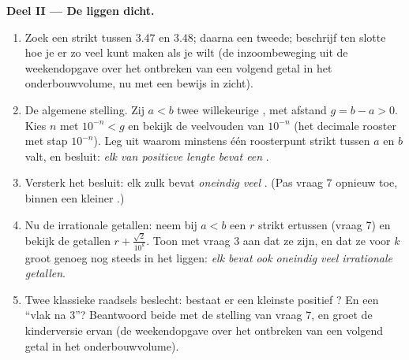 \begin{problem}
\medskip
\noindent\textbf{Deel II --- De  liggen dicht.}
\begin{enumerate}[resume]
  \item Zoek een  strikt tussen $3.47$ en $3.48$; daarna een
        tweede; beschrijf ten slotte hoe je er zo veel kunt maken als je
        wilt (de inzoombeweging uit de weekendopgave over het ontbreken van
        een volgend getal in het onderbouwvolume, nu met een bewijs in
        zicht).
  \item De algemene stelling. Zij $a < b$ twee willekeurige ,
        met afstand $g = b - a > 0$. Kies $n$ met $10^{-n} < g$ en bekijk de
        veelvouden van $10^{-n}$ (het decimale rooster met stap $10^{-n}$).
        Leg uit waarom minstens één roosterpunt strikt tussen $a$ en $b$
        valt, en besluit: \emph{elk  van positieve lengte bevat een
        }.
  \item Versterk het besluit: elk zulk  bevat \emph{oneindig veel}
        . (Pas vraag 7 opnieuw toe, binnen een kleiner
        .)
  \item Nu de irrationale getallen: neem bij $a < b$ een  $r$
        strikt ertussen (vraag 7) en bekijk de getallen
        $r + \frac{\sqrt2}{10^k}$. Toon met vraag 3 aan dat ze 
        zijn, en dat ze voor $k$ groot genoeg nog steeds in het 
        liggen: \emph{elk  bevat ook oneindig veel irrationale
        getallen}.
  \item Twee klassieke raadsels beslecht: bestaat er een kleinste positief
        ? En een  ``vlak na $3$''? Beantwoord beide met
        de stelling van vraag 7, en groet de kinderversie ervan (de
        weekendopgave over het ontbreken van een volgend getal in het
        onderbouwvolume).
\end{enumerate}


\end{problem}
